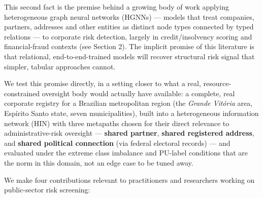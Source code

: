 \documentclass[11pt,]{article}
\begin{document}
This second fact is the premise behind a growing body of work applying
heterogeneous graph neural networks (HGNNs) --- models that treat
companies, partners, addresses and other entities as distinct node types
connected by typed relations --- to corporate risk detection, largely in
credit/insolvency scoring and financial-fraud contexts (see Section 2).
The implicit promise of this literature is that relational,
end-to-end-trained models will recover structural risk signal that
simpler, tabular approaches cannot.

We test this promise directly, in a setting closer to what a real,
resource-constrained oversight body would actually have available: a
complete, real corporate registry for a Brazilian metropolitan region
(the \emph{Grande Vitória} area, Espírito Santo state, seven
municipalities), built into a heterogeneous information network (HIN)
with three metapaths chosen for their direct relevance to
administrative-risk oversight --- \textbf{shared partner},
\textbf{shared registered address}, and \textbf{shared political
connection} (via federal electoral records) --- and evaluated under the
extreme class imbalance and PU-label conditions that are the norm in
this domain, not an edge case to be tuned away.

We make four contributions relevant to practitioners and researchers
working on public-sector risk screening:
\end{document}
